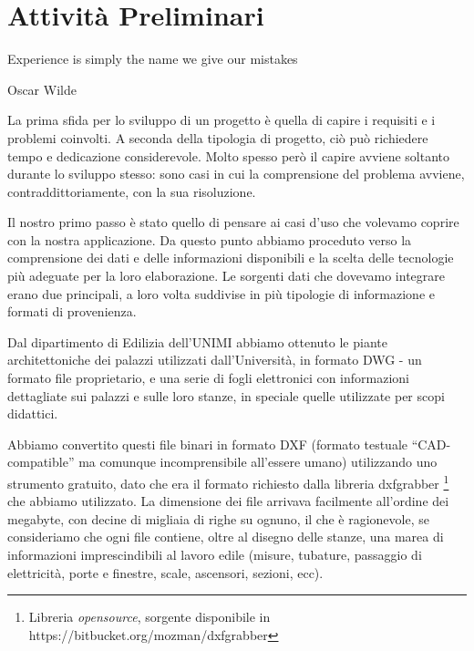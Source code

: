 \documentclass[12pt]{report}
\begin{document}
% 
% 
\chapter{Attività Preliminari}
\label{cap2}

\epigraph{Experience is simply the name we give our mistakes}{Oscar Wilde}



La prima sfida per lo sviluppo di un progetto è quella di capire i requisiti e i problemi coinvolti. A seconda della tipologia di progetto, ciò può richiedere tempo e dedicazione considerevole. Molto spesso però il capire avviene soltanto durante lo sviluppo stesso: sono casi in cui la comprensione del problema avviene, contraddittoriamente, con la sua risoluzione.

Il nostro primo passo è stato quello di pensare ai casi d'uso che volevamo coprire con la nostra applicazione. Da questo punto abbiamo proceduto verso la comprensione dei dati e delle informazioni disponibili e la scelta delle tecnologie più adeguate per la loro elaborazione. Le sorgenti dati che dovevamo integrare erano due principali, a loro volta suddivise in più tipologie di informazione e formati di provenienza.

Dal dipartimento di Edilizia dell'UNIMI abbiamo ottenuto le piante architettoniche dei palazzi utilizzati dall'Università, in formato DWG - un formato file proprietario, e una serie di fogli elettronici con informazioni dettagliate sui palazzi e sulle loro stanze, in speciale quelle utilizzate per scopi didattici.

Abbiamo convertito questi file binari in formato DXF (formato testuale ``CAD-compatible'' ma comunque incomprensibile all'essere umano) utilizzando uno strumento gratuito, dato che era il formato richiesto dalla libreria dxfgrabber \footnote{Libreria \textit{opensource}, sorgente disponibile in https://bitbucket.org/mozman/dxfgrabber} che abbiamo utilizzato. La dimensione dei file arrivava facilmente all'ordine dei megabyte, con decine di migliaia di righe su ognuno, il che è ragionevole, se consideriamo che ogni file contiene, oltre al disegno delle stanze, una marea di informazioni imprescindibili al lavoro edile (misure, tubature, passaggio di elettricità, porte e finestre, scale, ascensori, sezioni, ecc).
\end{document}
